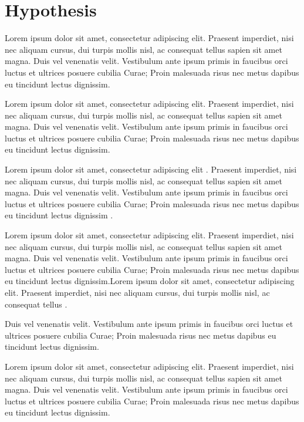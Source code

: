 \section{Hypothesis}

Lorem ipsum dolor sit amet, consectetur adipiscing elit. Praesent imperdiet, nisi 
nec aliquam cursus, dui turpis mollis nisl, ac consequat tellus sapien sit amet 
magna. Duis vel venenatis velit. Vestibulum ante ipsum primis in faucibus orci 
luctus et ultrices posuere cubilia Curae; Proin malesuada risus nec metus dapibus 
eu tincidunt lectus dignissim. 

Lorem ipsum dolor sit amet, consectetur adipiscing elit. Praesent imperdiet, nisi 
nec aliquam cursus, dui turpis mollis nisl, ac consequat tellus sapien sit amet 
magna. Duis vel venenatis velit. Vestibulum ante ipsum primis in faucibus orci 
luctus et ultrices posuere cubilia Curae; Proin malesuada risus nec metus dapibus 
eu tincidunt lectus dignissim. 

Lorem ipsum dolor sit amet, consectetur adipiscing elit \cite{Onur_Calikus_YLT}. Praesent imperdiet, nisi 
nec aliquam cursus, dui turpis mollis nisl, ac consequat tellus sapien sit amet 
magna. Duis vel venenatis velit. Vestibulum ante ipsum primis in faucibus orci 
luctus et ultrices posuere cubilia Curae; Proin malesuada risus nec metus dapibus 
eu tincidunt lectus dignissim \cite{unesco}.

Lorem ipsum dolor sit amet, consectetur adipiscing elit. Praesent imperdiet, nisi 
nec aliquam cursus, dui turpis mollis nisl, ac consequat tellus sapien sit amet 
magna. Duis vel venenatis velit. Vestibulum ante ipsum primis in faucibus orci 
luctus et ultrices posuere cubilia Curae; Proin malesuada risus nec metus dapibus 
eu tincidunt lectus dignissim.Lorem ipsum dolor sit amet, consectetur adipiscing elit. 
Praesent imperdiet, nisi nec aliquam cursus, dui turpis mollis nisl, ac consequat 
tellus \cite{mccaffrey88} \cite{moore91} \cite{nelson88}
\cite{sisaky} \cite{simpsondvd} \cite{startrek} \cite{TS-40561} \cite{url-1} \cite{url-2}
\cite{vanden2001}.

Duis vel venenatis velit. Vestibulum ante ipsum primis in faucibus orci 
luctus et ultrices posuere cubilia Curae; Proin malesuada risus nec metus dapibus 
eu tincidunt lectus dignissim.

Lorem ipsum dolor sit amet, consectetur adipiscing elit. Praesent imperdiet, nisi 
nec aliquam cursus, dui turpis mollis nisl, ac consequat tellus sapien sit amet 
magna. Duis vel venenatis velit. Vestibulum ante ipsum primis in faucibus orci 
luctus et ultrices posuere cubilia Curae; Proin malesuada risus nec metus dapibus 
eu tincidunt lectus dignissim.

